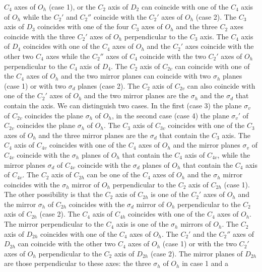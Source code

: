 \documentclass[12pt,a4paper]{article}
\begin{document}
$C_4$ axes of $O_h$ (case 1), or the $C_2$ axis of $D_2$ can coincide with one
of the $C_4$ axis of $O_h$ while the $C_2'$ and $C_2''$ coincide 
with the $C_2'$ axes of $O_h$ (case 2). The $C_3$ axis of $D_3$ coincides with
one of the four $C_3$ axes of $O_h$ and the three $C_2$ axes coincide with
the three $C_2'$ axes of $O_h$ perpendicular to the $C_3$ axis. The $C_4$
axis of $D_4$ coincides with one of the $C_4$ axes of $O_h$ and the
$C_2'$ axes coincide with the other two $C_4$ axes while the $C_2''$ axes
of $C_4$ coincide with the two $C_2'$ axes of $O_h$ perpendicular to the
$C_4$ axis of $D_4$. The $C_2$ axis of $C_{2v}$ can coincide with one of
the $C_4$ axes of $O_h$ and the two mirror planes can coincide with two
$\sigma_h$ planes (case 1) or with two $\sigma_d$ planes (case 2). The
$C_2$ axis of $C_{2v}$ can also coincide with one of the $C_2'$ axes
of $O_h$ and the two mirror planes are the $\sigma_h$ and the $\sigma_d$ 
that contain the axis. We can distinguish two cases. In the first (case 3)
the plane $\sigma_v$ of $C_{2v}$ coincides the plane $\sigma_h$ of $O_h$, 
in the second case (case 4) the plane $\sigma_v'$ of $C_{2v}$ coincides 
the plane $\sigma_h$ of $O_h$.
The $C_3$ axis of $C_{3v}$ coincides with one of the $C_3$ axes of $O_h$ and
the three mirror planes are the $\sigma_d$ that contain the $C_3$ axis.
The $C_4$ axis of $C_{4v}$ coincides with one of the $C_4$ axes of $O_h$
and the mirror planes $\sigma_v$ of $C_{4v}$ coincide with the $\sigma_h$
planes of $O_h$ that contain the $C_4$ axis of $C_{4v}$, 
while the mirror planes $\sigma_d$ of $C_{4v}$ coincide
with the $\sigma_d$ planes of $O_h$ that contain the $C_4$ axis of $C_{4v}$.
The $C_2$ axis of $C_{2h}$ can be one of the $C_4$ axes of $O_h$ and
the $\sigma_h$ mirror coincides with the $\sigma_h$ mirror of $O_h$ 
perpendicular to the $C_2$ axis of $C_{2h}$ (case 1).
The other possibility is that the $C_2$ axis of $C_{2h}$ is one of 
the $C_2'$ axes of $O_h$ and the mirror $\sigma_h$ of $C_{2h}$ coincides with
the $\sigma_d$ mirror of $O_h$ perpendicular to the $C_2$ axis of $C_{2h}$
(case 2). The $C_4$ axis of $C_{4h}$ coincides with one of the
$C_4$ axes of $O_h$. The mirror perpendicular to the $C_4$ axis is one of
the $\sigma_h$ mirrors of $O_h$. 
The $C_2$ axis of $D_{2h}$ coincides with one of the $C_4$ axes of $O_h$. 
The $C_2'$ and the $C_2''$ axes of $D_{2h}$ can coincide with the other two 
$C_4$ axes of $O_h$ (case 1) or with the two $C_2'$ axes of $O_h$
perpendicular to the $C_2$ axis of $D_{2h}$ (case 2). The mirror planes of 
$D_{2h}$ are those 
perpendicular to these axes: the three $\sigma_h$ of $O_h$ in case 1 and a
\end{document}
